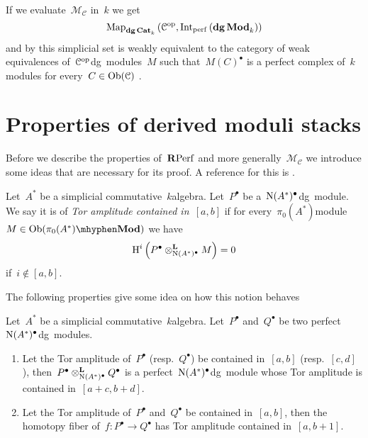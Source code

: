 \begin{refsection}
\begin{example}
  If we evaluate~$\mathcal{M}_{\mathcal{C}}$ in~$k$ we get
  \begin{equation}
    \Map_{\dgCat_k}\left( \mathcal{C}^\opp,\Int_\perf\left( \dgMod_k \right) \right)
  \end{equation}
  and by \cite{toen} this simplicial set is weakly equivalent to the category of weak equivalences of~$\mathcal{C}^{\mathrm{op}}$\dash dg~modules~$M$ such that~$M(C)^\bullet$ is a perfect complex of~$k$\dash modules for every~$C\in\operatorname{Ob}(\mathcal{C})$ \cite[corollary 7.6]{toen}.
\end{example}


\section{Properties of derived moduli stacks}
\label{section:properties}
Before we describe the properties of~$\mathbf{R}\mathrm{Perf}$ and more generally~$\mathcal{M}_{\mathcal{C}}$ we introduce some ideas that are necessary for its proof. A reference for this is \cite[expos\'es I--III]{sga6}.
\begin{definition}
  Let~$A^*$ be a simplicial commutative~$k$\dash algebra. Let~$P^\bullet$ be a~$\operatorname{N}(A^*)^\bullet$\dash dg~module. We say it is of \emph{Tor amplitude contained in~$[a,b]$} if for every~$\pi_0(A^*)$\dash module~$M\in\Ob(\pi_0(A^*)\mhyphen\Mod)$ we have
  \begin{equation}
    \operatorname{H}^i\left( P^\bullet\otimes_{\operatorname{N}(A^*)^\bullet}^{\mathbf{L}} M \right)=0
  \end{equation}
  if~$i\notin[a,b]$.
\end{definition}
The following properties give some idea on how this notion behaves \cite[proposition 2.22]{toen-vaquie}
\begin{proposition}
  \label{proposition:Tor-amplitude}
  Let~$A^*$ be a simplicial commutative~$k$\dash algebra. Let~$P^\bullet$ and~$Q^\bullet$ be two perfect~$\operatorname{N}(A^*)^\bullet$\dash dg~modules.
  \begin{enumerate}
    \item\label{enumerate:Tor-amplitude-1} Let the Tor amplitude of~$P^\bullet$ (resp.\ $Q^\bullet$) be contained in~$[a,b]$ (resp.\ $[c,d]$), then~$P^\bullet\otimes_{\operatorname{N}(A^*)^\bullet}^{\mathbf{L}}Q^\bullet$ is a perfect~$\operatorname{N}(A^*)^\bullet$\dash dg~module whose Tor amplitude is contained in~$[a+c,b+d]$.
    \item\label{enumerate:Tor-amplitude-2} Let the Tor amplitude of~$P^\bullet$ and~$Q^\bullet$ be contained in~$[a,b]$, then the homotopy fiber of~$f\colon P^\bullet\to Q^\bullet$ has Tor amplitude contained in~$[a,b+1]$.

\end{enumerate}
\end{proposition}
\end{refsection}
